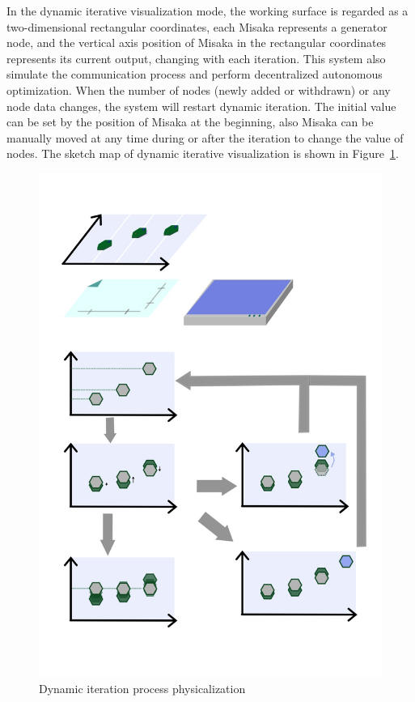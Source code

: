 \documentclass[conference]{IEEEtran}
\begin{document}
In the dynamic iterative visualization mode, the working surface is regarded as a two-dimensional rectangular coordinates, each Misaka represents a generator node, and the vertical axis position of Misaka in the rectangular coordinates represents its current output, changing with each iteration. This system also simulate the communication process and perform decentralized autonomous optimization. When the number of nodes (newly added or withdrawn) or any node data changes, the system will restart dynamic iteration. The initial value can be set by the position of Misaka at the beginning, also Misaka can be manually moved at any time during or after the iteration to change the value of nodes. The sketch map of dynamic iterative visualization is shown in Figure~\ref{fig:iteration}. 

\begin{figure}[htbp]
    \centering
    \includegraphics[width=\columnwidth]{IMG_0315.JPG}
    \caption{Dynamic iteration process physicalization}
    \label{fig:iteration}
\end{figure}
\end{document}
